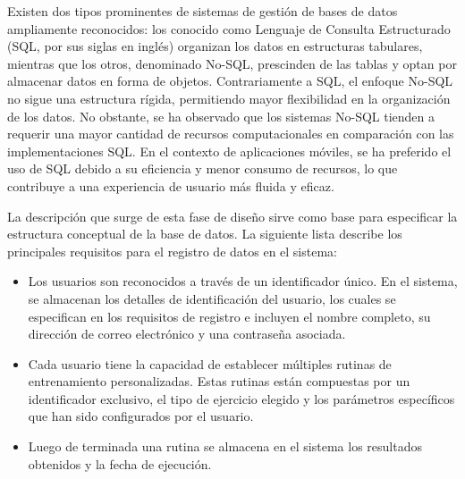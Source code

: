 \newpage
{}
Existen dos tipos prominentes de sistemas de gestión de bases de datos ampliamente reconocidos: los conocido como Lenguaje de Consulta Estructurado (SQL, por sus siglas en inglés) organizan los datos en estructuras tabulares, mientras que los otros, denominado No-SQL, prescinden de las tablas y optan por almacenar datos en forma de objetos. Contrariamente a SQL, el enfoque No-SQL no sigue una estructura rígida, permitiendo mayor flexibilidad en la organización de los datos. No obstante, se ha observado que los sistemas No-SQL tienden a requerir una mayor cantidad de recursos computacionales en comparación con las implementaciones SQL. En el contexto de aplicaciones móviles, se ha preferido el uso de SQL debido a su eficiencia y menor consumo de recursos, lo que contribuye a una experiencia de usuario más fluida y eficaz.

La descripción que surge de esta fase de diseño sirve como base para especificar la estructura conceptual de la base de datos. 
La siguiente lista describe los principales requisitos para el registro de datos en el sistema:
\begin{itemize}
    \item Los usuarios son reconocidos a través de un identificador único. En el sistema, se almacenan los detalles de identificación del usuario, los cuales se especifican en los requisitos de registro e incluyen el nombre completo, su dirección de correo electrónico y una contraseña asociada.
    \item Cada usuario tiene la capacidad de establecer múltiples rutinas de entrenamiento personalizadas. Estas rutinas están compuestas por un identificador exclusivo, el tipo de ejercicio elegido y los parámetros específicos que han sido configurados por el usuario. 
    \item Luego de terminada una rutina se almacena en el sistema los resultados obtenidos y la fecha de ejecución. 
\end{itemize}   
    
